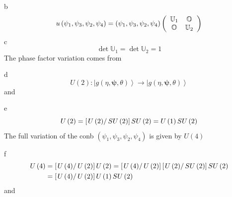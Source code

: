 \documentclass[aps,preprint]{revtex4}%
\begin{document}
b%
\[
u\left(  \psi_{1},\psi_{3},\psi_{2},\psi_{4}\right)  =\left(  \psi_{1}%
,\psi_{3},\psi_{2},\psi_{4}\right)  \left(
\begin{array}
[c]{cc}%
\mathbb{U}_{1} & \mathbb{O}\\
\mathbb{O} & \mathbb{U}_{2}%
\end{array}
\right)
\]
c%
\[
\det\mathbb{U}_{1}=\det\mathbb{U}_{2}=1
\]
The phase factor variation comes from

d%
\[
U\left(  2\right)  :\left\vert g\left(  \eta\mathbf{,\psi,}\theta\right)
\right\rangle \rightarrow\left\vert g\left(  \eta\mathbf{,\psi,}\theta\right)
\right\rangle
\]
and

e%
\[
U\left(  2\right)  =\left[  \left.  U\left(  2\right)  \right/  SU\left(
2\right)  \right]  SU\left(  2\right)  =U\left(  1\right)  SU\left(  2\right)
\]
The full variation of the conb $\left(  \psi_{1},\psi_{3},\psi_{2},\psi
_{4}\right)  $ is given by $U\left(  4\right)  $

f%
\begin{align*}
U\left(  4\right)   &  =\left[  \left.  U\left(  4\right)  \right/  U\left(
2\right)  \right]  U\left(  2\right)  =\left[  \left.  U\left(  4\right)
\right/  U\left(  2\right)  \right]  \left[  \left.  U\left(  2\right)
\right/  SU\left(  2\right)  \right]  SU\left(  2\right) \\
&  =\left[  \left.  U\left(  4\right)  \right/  U\left(  2\right)  \right]
U\left(  1\right)  SU\left(  2\right)
\end{align*}
and
\end{document}
